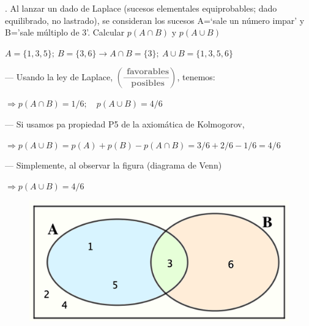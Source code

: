 \begin{example}
.	Al lanzar un dado de Laplace (sucesos elementales equiprobables; dado equilibrado, no lastrado), se consideran los sucesos A=`sale un número impar' y B='sale múltiplo de 3'. Calcular $p(A\cap B) \text{ y } p(A\cup B)$

\vspace{4mm} $A=\{1,3,5\};\ B=\{3,6\} \to A\cap B=\{3\};\ A\cup B=\{1,3,5,6\}$

\vspace{2mm} --- Usando la ley de Laplace, 	$\textcolor{gris}{\left(  \dfrac{\textbf{ favorables}}{\textbf{ posibles}} \right)}$, tenemos:

\vspace{2mm}$\Rightarrow p(A\cap B)= 1/6;\quad p(A\cup B)=4/6$

\vspace{2mm} --- Si usamos pa propiedad P5 de la axiomática de Kolmogorov,

\vspace{2mm}$\Rightarrow p(A\cup B)=p(A)+ p(B)-p(A\cap B)=3/6+2/6-1/6=4/6$
	
\vspace{2mm} --- Simplemente, al observar la figura (diagrama de Venn)

\vspace{2mm} $\Rightarrow p(A\cup B)=4/6$

\begin{figure}[H]
			\centering
			\includegraphics[width=.5\textwidth]{imagenes/imagenes02/T02IM16.png}
	\end{figure}
\end{example}

